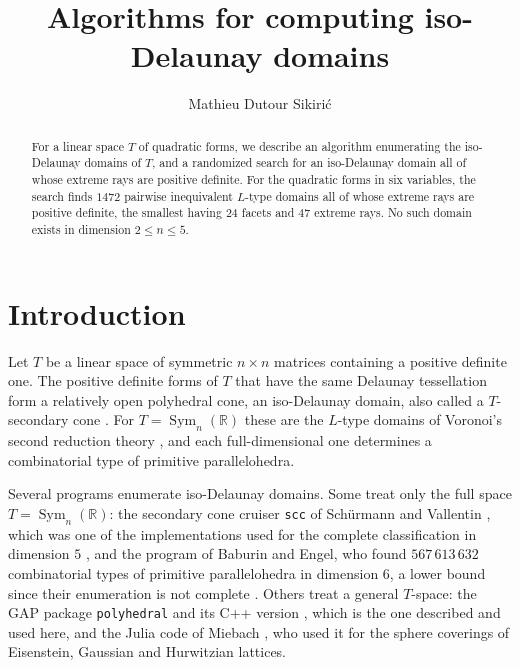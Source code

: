 \documentclass{amsart}
\newcommand{\Sym}{\operatorname{Sym}}
\newcommand{\RR}{\mathbb{R}}
\begin{document}
\author{Mathieu Dutour Sikiri\'c}
\address{Mathieu Dutour Sikiri\'c, MSM programming, Karlovacka cesta 28B, 10452 Klinca selo}

\title{Algorithms for computing iso-Delaunay domains}

\date{}

\begin{abstract}
For a linear space \(T\) of quadratic forms, we describe an algorithm
enumerating the iso-Delaunay domains of \(T\), and a randomized search for an
iso-Delaunay domain all of whose extreme rays are positive definite.  For the
quadratic forms in six variables, the search finds \(1472\) pairwise
inequivalent \(L\)-type domains all of whose extreme rays are positive
definite, the smallest having \(24\) facets and \(47\) extreme rays.  No such
domain exists in dimension \(2\leq n\leq 5\).
\end{abstract}

\maketitle

\section{Introduction}

Let \(T\) be a linear space of symmetric \(n\times n\) matrices containing a
positive definite one.  The positive definite forms of \(T\) that have the
same Delaunay tessellation form a relatively open polyhedral cone, an
iso-Delaunay domain, also called a \(T\)-secondary cone
\cite{DutourSikiriSchurmannVallentin2008}.  For \(T=\Sym_n(\RR)\) these are
the \(L\)-type domains of Voronoi's second reduction theory
\cite{Voronoi1908}, and each full-dimensional one determines a combinatorial
type of primitive parallelohedra.

Several programs enumerate iso-Delaunay domains.  Some treat only the full
space \(T=\Sym_n(\RR)\): the secondary cone cruiser \texttt{scc} of
Sch\"urmann and Vallentin \cite{SchurmannVallentinSCC}, which was one of the
implementations used for the complete classification in dimension \(5\)
\cite{DutourSikiricGarberSchurmannWaldmann2016}, and the program of Baburin
and Engel, who found \(567\,613\,632\) combinatorial types of primitive
parallelohedra in dimension \(6\), a lower bound since their enumeration is
not complete \cite{BaburinEngel2013}.  Others
treat a general \(T\)-space: the GAP package \texttt{polyhedral}
\cite{DutourSikiricGAPpolyhedral} and its C++ version
\cite{DutourSikiricPolyhedralCommon}, which is the one described and used
here, and the Julia code of Miebach \cite{Miebach2025}, who used it for the
sphere coverings of Eisenstein, Gaussian and Hurwitzian lattices.
\end{document}
